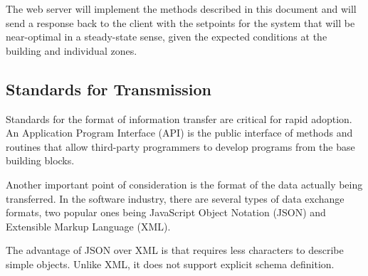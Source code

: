 The web server will implement the methods described in this document and will send a response back to the client with the setpoints for the system that will be near-optimal in a steady-state sense, given the expected conditions at the building and individual zones. 

\subsection{Standards for Transmission}

Standards for the format of information transfer are critical for rapid adoption. An Application  Program Interface (API) is the public interface of methods and routines that allow third-party programmers to develop programs from the base building blocks. 

Another important point of consideration is the format of the data actually being transferred. In the software industry, there are several types of data exchange formats, two popular ones being JavaScript Object Notation (JSON) and Extensible Markup Language (XML). 

The advantage of JSON over XML is that requires less characters to describe simple objects. Unlike XML, it does not support explicit schema definition. 



